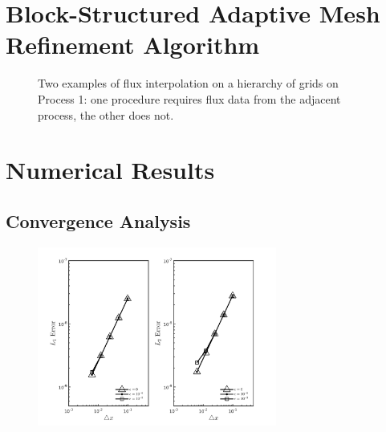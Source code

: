 \documentclass{article}
\begin{document}
\section{Block-Structured Adaptive Mesh Refinement Algorithm}


        \begin{figure}[H]
            \center
            
           \caption{Two examples of flux interpolation on a hierarchy of grids
            on Process 1: one procedure requires flux data from the adjacent
            process, the other does not.}
        \end{figure}

\section{Numerical Results}

    \subsection{Convergence Analysis}

        \begin{figure}
            \centering
            \includegraphics[width=0.7\textwidth]{convergence.png}
            \caption{}
        \end{figure}
\end{document}
